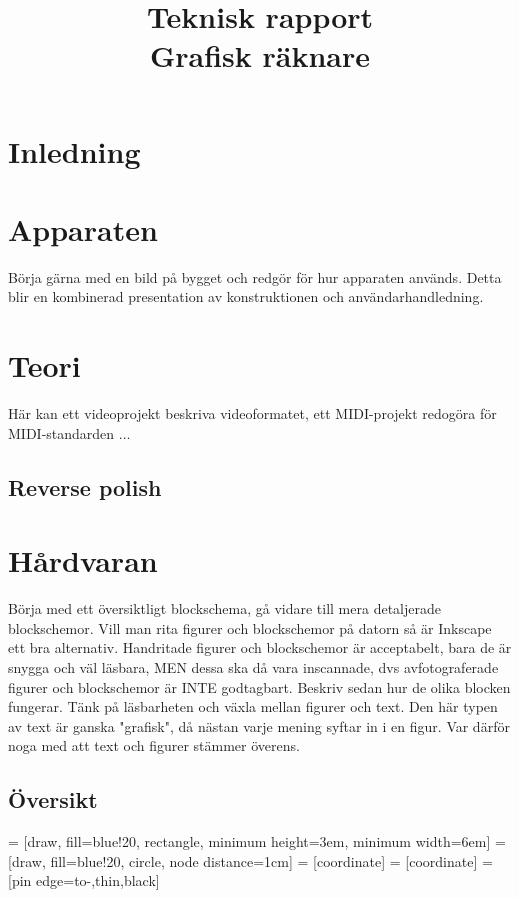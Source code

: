 \documentclass[]{article}
\title{Teknisk rapport\\Grafisk räknare}
\author{}
\begin{document}
\maketitle

\begin{abstract}
\end{abstract}
\section{Inledning}

\section{Apparaten}
Börja gärna med en bild på bygget och redgör för hur apparaten används. Detta blir en kombinerad presentation av konstruktionen och användarhandledning. 
\section{Teori}
Här kan ett videoprojekt beskriva videoformatet, ett MIDI-projekt redogöra för MIDI-standarden ...
\subsection{Reverse polish}
\section{Hårdvaran}
Börja med ett översiktligt blockschema, gå vidare till mera detaljerade blockschemor. Vill man rita figurer och blockschemor på datorn så är Inkscape ett bra alternativ. Handritade figurer och blockschemor är acceptabelt, bara de är snygga och väl läsbara, MEN dessa ska då vara inscannade, dvs avfotograferade figurer och blockschemor är INTE godtagbart.
Beskriv sedan hur de olika blocken fungerar. Tänk på läsbarheten och växla mellan figurer och text. Den här typen av text är ganska "grafisk", då nästan varje mening syftar in i en figur. Var därför noga med att text och figurer stämmer överens.
\subsection{Översikt}

 = [draw, fill=blue!20, rectangle, 
minimum height=3em, minimum width=6em]
 = [draw, fill=blue!20, circle, node distance=1cm]
 = [coordinate]
 = [coordinate]
 = [pin edge={to-,thin,black}]
\end{document}

